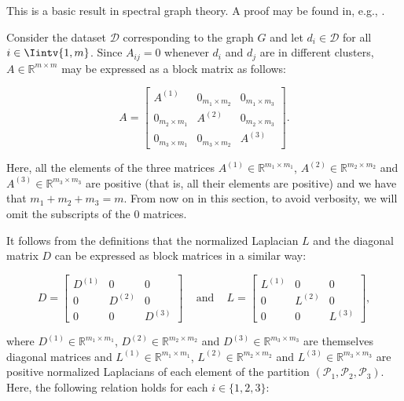 This is a basic result in spectral graph theory.
A proof may be found in, e.g., \cite{mahoney}.

Consider the dataset $\mathcal D$ corresponding to the graph $G$ and let $d_i \in \mathcal D$ for all $i \in \Iintv{1,m}$. Since $A_{ij} = 0$ whenever $d_i$ and $d_j$ are in different clusters, $A \in \mathbb{R} ^{m \times m}$ may be expressed as a block matrix as follows:

\begin{equation}
   A = 
   \begin{bmatrix}
      A^{(1)} & 0_{m_1 \times m_2} & 0_{m_1 \times m_3} \\
      0_{m_2 \times m_1} & A^{(2)} & 0_{m_2 \times m_3} \\
      0_{m_3 \times m_1} & 0_{m_3 \times m_2} & A^{(3)}
   \end{bmatrix}.
\end{equation}

Here, all the elements of the three matrices $A^{(1)} \in \mathbb R^{m_1 \times m_1}$, $A^{(2)} \in \mathbb R^{m_2 \times m_2}$ and $A^{(3)} \in \mathbb R ^{m_3 \times m_3}$ are positive (that is, all their elements are positive) and we have that $m_1+m_2+m_3 = m$. 
From now on in this section, to avoid verbosity, we will omit the subscripts of the $0$ matrices.

It follows from the definitions that the normalized Laplacian $L$ and the diagonal matrix $D$ can be expressed as block matrices in a similar way:

\begin{equation}
 D =
   \begin{bmatrix}
      D^{(1)} & 0 & 0 \\
      0 & D^{(2)} & 0 \\
      0 & 0 & D^{(3)}
   \end{bmatrix}
   \,\,\,\,\,\text{ and }\,\,\,\,\,
   L = 
   \begin{bmatrix}
      L^{(1)} & 0 & 0 \\
      0 & L^{(2)} & 0 \\
      0 & 0 & L^{(3)}
   \end{bmatrix},
\end{equation}

where $D^{(1)} \in \mathbb R ^{m_1 \times m_1}$, $D^{(2)} \in \mathbb R ^{m_2 \times m_2}$ and $D^{(3)} \in \mathbb R ^{m_3 \times m_3}$ are themselves diagonal matrices and $L^{(1)} \in \mathbb R ^{m_1 \times m_1}$, $L^{(2)} \in \mathbb R ^{m_2 \times m_2}$ and $L^{(3)} \in \mathbb R ^{m_3 \times m_3}$ are positive normalized Laplacians of each element of the partition $(\mathcal P_1, \mathcal P_2, \mathcal P_3)$.
Here, the following relation holds for each $i \in \{1, 2, 3 \}$:

